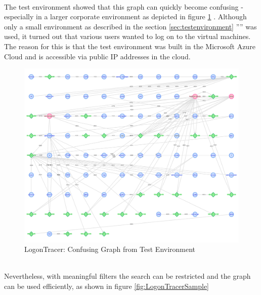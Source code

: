 \clearpage \ \\
The test environment showed that this graph can quickly become confusing - especially in a larger corporate environment as depicted in figure \ref{fig:LogonTraceerConfusing} . Although only a small environment as described in the section \ref{sec:testenvironment} '''' was used, it turned out that various users wanted to log on to the virtual machines. The reason for this is that the test environment was built in the Microsoft Azure Cloud and is accessible via public IP addresses in the cloud.

\begin{figure}[H]
    \centering
    \includegraphics[width=0.8\linewidth]{assets/LogonTracer/logontracer_confusing.png}
    \caption{LogonTracer: Confusing Graph from Test Environment}
    \label{fig:LogonTraceerConfusing}
\end{figure} \ \\
Nevertheless, with meaningful filters the search can be restricted and the graph can be used efficiently, as shown in figure \ref{fig:LogonTracerSample} 

\clearpage

